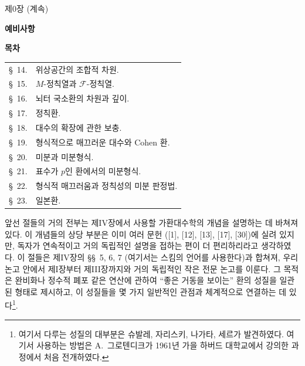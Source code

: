 \clearpage
\thispagestyle{plain}
\label{chapter:0IV1-fr}

\begin{center}
{\large 제0장 (계속)\footnotemark\par}
\vspace{1.5em}
{\Large\bfseries 예비사항\par}
\vspace{2em}
{\large\bfseries 목차\par}
\end{center}


\begin{center}
\begin{tabular}{@{}r l@{}}
\S~14. & 위상공간의 조합적 차원.\\
\S~15. & $M$-정칙열과 $\mathscr F$-정칙열.\\
\S~16. & 뇌터 국소환의 차원과 깊이.\\
\S~17. & 정칙환.\\
\S~18. & 대수의 확장에 관한 보충.\\
\S~19. & 형식적으로 매끄러운 대수와 Cohen 환.\\
\S~20. & 미분과 미분형식.\\
\S~21. & 표수가 $p$인 환에서의 미분형식.\\
\S~22. & 형식적 매끄러움과 정칙성의 미분 판정법.\\
\S~23. & 일본환.
\end{tabular}
\end{center}

앞선 절들의 거의 전부는 제IV장에서 사용할 가환대수학의 개념을
설명하는 데 바쳐져 있다. 이 개념들의 상당 부분은 이미 여러 문헌
([1], [12], [13], [17], [30])에 실려 있지만, 독자가 연속적이고 거의
독립적인 설명을 접하는 편이 더 편리하리라고 생각하였다. 이 절들은
제IV장의 \S\S~5, 6, 7 (여기서는 스킴의 언어를 사용한다)과 합쳐져,
우리 논고 안에서 제I장부터 제III장까지와 거의 독립적인 작은 전문
논고를 이룬다. 그 목적은 완비화나 정수적 폐포 같은 연산에 관하여
``좋은 거동을 보이는'' 환의 성질을 일관된 형태로 제시하고, 이
성질들을 몇 가지 일반적인 관점과 체계적으로 연결하는 데
있다\footnote{여기서 다루는 성질의 대부분은 슈발레, 자리스키,
나가타, 세르가 발견하였다. 여기서 사용하는 방법은 A.~그로텐디크가
1961년 가을 하버드 대학교에서 강의한 과정에서 처음 전개하였다.}.

\setcounter{section}{13}

